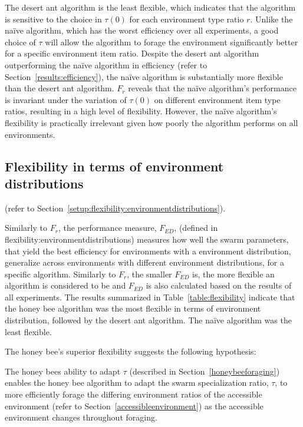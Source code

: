 The desert ant algorithm is the least flexible, which indicates that the algorithm is sensitive to the choice in $\tau(0)$ for each environment type ratio $r$. Unlike the na\"ive algorithm, which has the worst efficiency over all experiments, a good choice of $\tau$ will allow the algorithm to forage the environment significantly better for a specific environment item ratio. Despite the desert ant algorithm outperforming the na\"ive algorithm in efficiency (refer to Section~\ref{results:efficiency}), the na\"ive algorithm is substantially more flexible than the desert ant algorithm. $F_r$ reveals that the na\"ive algorithm's performance is invariant under the variation of $\tau(0)$ on different environment item type ratios, resulting in a high level of flexibility. However, the na\"ive algorithm's flexibility is practically irrelevant given how poorly the algorithm performs on all environments. 


\subsection{Flexibility in terms of environment distributions}
\label{results:flexibility:environmentdistribution}

 (refer to Section~\ref{setup:flexibility:environmentdistributions}).

Similarly to $F_r$, the performance measure, $F_{ED}$, (defined in flexibility:environmentdistributions) measures how well the swarm parameters, that yield the best efficiency for environments with a environment distribution, generalize across environments with different environment distributions, for a specific algorithm. Similarly to $F_r$, the smaller $F_{ED}$ is, the more flexible an algorithm is considered to be and $F_{ED}$ is also calculated based on the results of all experiments. The results summarized in Table~\ref{table:flexibility} indicate that the honey bee algorithm was the most flexible in terms of environment distribution, followed by the desert ant algorithm. The na\"ive algorithm was the least flexible.

The honey bee's superior flexibility suggests the following hypothesis:

The honey bees ability to adapt $\tau$ (described in Section~\ref{honeybeeforaging}) enables the honey bee algorithm to adapt the swarm specialization ratio, $\tau$, to more efficiently forage the differing environment ratios of the accessible environment (refer to Section~\ref{accessibleenvironment}) as the accessible environment changes throughout foraging.

